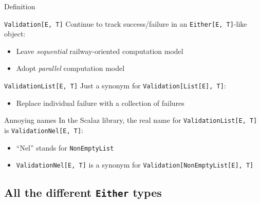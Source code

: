 \begin{frame}{Definition}
  \begin{block}{\texttt{Validation[E, T]}}
    Continue to track success/failure in an
    \texttt{Either[E, T]}-like object:
    \begin{itemize}
    \item Leave \emph{sequential} railway-oriented computation model
    \item Adopt \emph{parallel} computation model
    \end{itemize}
  \end{block}

  \begin{block}{\texttt{ValidationList[E, T]}}
    Just a synonym for \texttt{Validation[List[E], T]}:
    \begin{itemize}
    \item Replace individual failure with a collection of failures
    \end{itemize}
  \end{block}

  \begin{alertblock}{Annoying names}
    In the Scalaz library, the real name for
    \texttt{ValidationList[E, T]} is
    \texttt{ValidationNel[E, T]}:
    \begin{itemize}
    \item ``Nel'' stands for \texttt{NonEmptyList}
    \item \texttt{ValidationNel[E, T]} is a synonym for
      \texttt{Validation[NonEmptyList[E], T]}
    \end{itemize}
  \end{alertblock}
\end{frame}

\subsection{All the different \texttt{Either} types}


